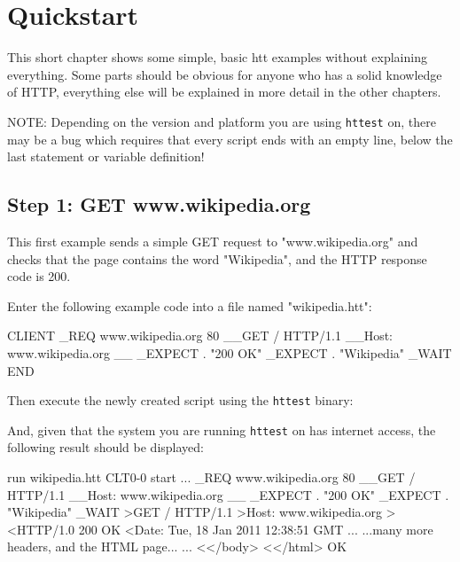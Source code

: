 \chapter{Quickstart}
\label{chap:quickstart}

This short chapter shows some simple, basic htt examples without explaining 
everything. Some parts should be obvious for anyone who has a solid knowledge 
of HTTP, everything else will be explained in more detail in the other chapters.

NOTE: Depending on the version and platform you are using \texttt{httest} on, there may be 
a bug which requires that every script ends with an empty line, below the last
statement or variable definition!

\section{Step 1: GET www.wikipedia.org} 

This first example sends a simple GET request to "www.wikipedia.org" and checks 
that the page contains the word "Wikipedia", and the HTTP response code is 200.

Enter the following example code into a file named "wikipedia.htt":

\begin{usplisting}
    CLIENT
    _REQ www.wikipedia.org 80
    __GET / HTTP/1.1
    __Host: www.wikipedia.org
    __
    _EXPECT . "200 OK"
    _EXPECT . "Wikipedia"
    _WAIT
    END
\end{usplisting}

Then execute the newly created script using the \texttt{httest} binary:


\newpage 
And, given that the system you are running \texttt{httest} on has internet 
access, the following result should be displayed:

\begin{usplisting}
    run wikipedia.htt
    CLT0-0 start ...
    _REQ www.wikipedia.org 80
    __GET / HTTP/1.1
    __Host: www.wikipedia.org
    __
    _EXPECT . "200 OK"
    _EXPECT . "Wikipedia"
    _WAIT
    >GET / HTTP/1.1
    >Host: www.wikipedia.org
    >
    <HTTP/1.0 200 OK
    <Date: Tue, 18 Jan 2011 12:38:51 GMT
    ...
    ...many more headers, and the HTML page...
    ...
    <</body>
    <</html> OK
\end{usplisting}

